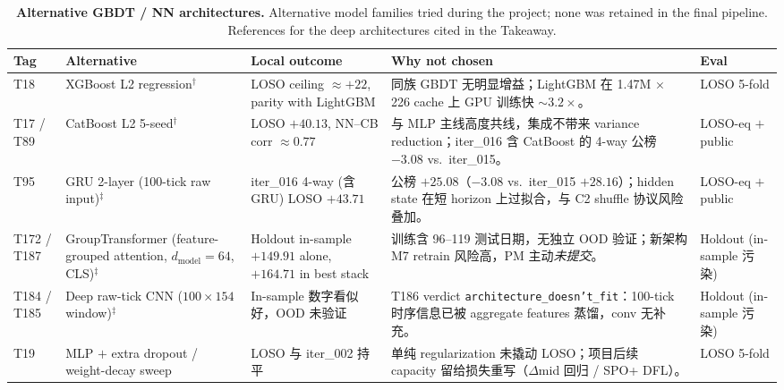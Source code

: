 \documentclass[11pt]{article}
\begin{document}
\begin{table}[!htbp]
\centering
\caption{\textbf{Alternative GBDT / NN architectures.} Alternative model families tried during the project; none was retained in the final pipeline. References for the deep architectures cited in the Takeaway.}
\label{tab:abl_alt}
\setlength{\tabcolsep}{4pt}\renewcommand{\arraystretch}{1.15}
\small
\begin{tabularx}{\textwidth}{@{}>{\raggedright\arraybackslash}p{1.4cm} >{\raggedright\arraybackslash}p{3.0cm} >{\raggedright\arraybackslash}X >{\raggedright\arraybackslash}p{4.6cm} >{\raggedright\arraybackslash}p{1.6cm}@{}}
\toprule
Tag & Alternative & Local outcome & Why not chosen & Eval \\
\midrule
T18                & XGBoost L2 regression$^{\dagger}$                                                & LOSO ceiling $\approx +22$, parity with LightGBM            & 同族 GBDT 无明显增益；LightGBM 在 1.47M $\times$ 226 cache 上 GPU 训练快 $\sim 3.2\!\times$。                                                                & LOSO 5-fold \\
T17 / T89          & CatBoost L2 5-seed$^{\dagger}$                                                   & LOSO $+40.13$, NN--CB corr $\approx 0.77$                   & 与 MLP 主线高度共线，集成不带来 variance reduction；iter\_016 含 CatBoost 的 4-way 公榜 $-3.08$ vs.\ iter\_015。                                              & LOSO-eq $+$ public \\
T95                & GRU 2-layer (100-tick raw input)$^{\ddagger}$                                    & iter\_016 4-way (含 GRU) LOSO $+43.71$                       & 公榜 $+25.08$（$-3.08$ vs.\ iter\_015 $+28.16$）；hidden state 在短 horizon 上过拟合，与 C2 shuffle 协议风险叠加。                                              & LOSO-eq $+$ public \\
T172 / T187        & GroupTransformer (feature-grouped attention, $d_{\text{model}}{=}64$, CLS)$^{\ddagger}$ & Holdout in-sample $+149.91$ alone, $+164.71$ in best stack & 训练含 96--119 测试日期，无独立 OOD 验证；新架构 M7 retrain 风险高，PM 主动\emph{未提交}。                                                                          & Holdout (in-sample 污染) \\
T184 / T185        & Deep raw-tick CNN ($100\!\times\!154$ window)$^{\ddagger}$                       & In-sample 数字看似好，OOD 未验证                            & T186 verdict \texttt{architecture\_doesn't\_fit}：100-tick 时序信息已被 aggregate features 蒸馏，conv 无补充。                                                  & Holdout (in-sample 污染) \\
T19                & MLP $+$ extra dropout / weight-decay sweep                                       & LOSO 与 iter\_002 持平                                       & 单纯 regularization 未撬动 LOSO；项目后续 capacity 留给损失重写（$\Delta$mid 回归 / SPO+ DFL）。                                                                & LOSO 5-fold \\
\bottomrule
\end{tabularx}


\end{table}
\end{document}
